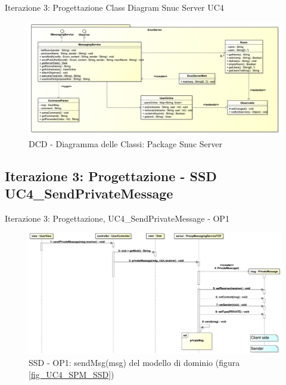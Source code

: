 \begin{frame} {Iterazione 3: Progettazione Class Diagram Snuc Server UC4}
   \begin{figure}
     \includegraphics[scale=0.155]{image_astah/Iteration_3_DesignModel/ClassDiagramSnucServer.png}{\centering}
     \caption{DCD - Diagramma delle Classi: Package Snuc Server }
     \label{fig_UC4_DCD_2} 
   \end{figure}
\end{frame}

\subsection{Iterazione 3: Progettazione - SSD UC4\_SendPrivateMessage}
\begin{frame} {Iterazione 3: Progettazione, UC4\_SendPrivateMessage - OP1}
   \begin{figure}
     \includegraphics[scale=0.16]{image_astah/Iteration_3_DesignModel/UC4_SendPrivateMessage_SSD_1_sendMsg.png}{\centering}
     \caption{SSD - OP1: sendMsg(msg) del modello di dominio (figura \ref{fig_UC4_SPM_SSD}) }
     \label{fig_UC4_SSD_SRM_1} 
   \end{figure}
\end{frame}

